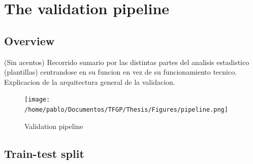 \chapter{The validation pipeline}
%
\label{chap:Chap_1}

\section{Overview}
(Sin acentos) Recorrido sumario por las distintas partes del analisis estadistico (plantillas) centrandose en su funcion en vez de su funcionamiento tecnico. Explicacion de la arquitectura general de la validacion.\\
%
\begin{figure}[!htb]
	\centering
	\texttt{[image: /home/pablo/Documentos/TFGP/Thesis/Figures/pipeline.png]}
	\caption{Validation pipeline}
	\label{fig:pipeline}
\end{figure}
%
\clearpage
\section{Train-test split}\label{sec:ttsplit}
